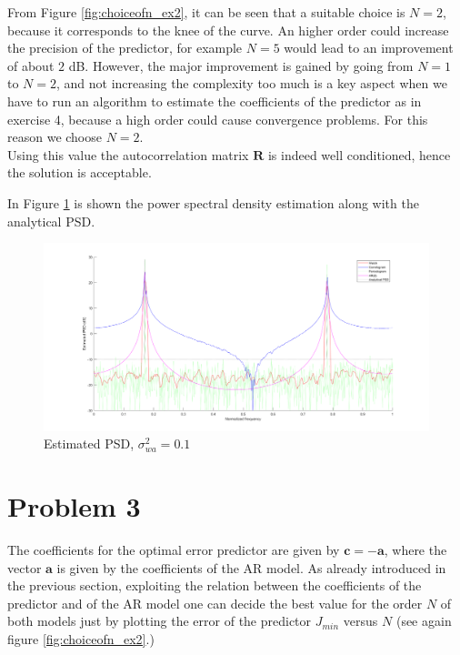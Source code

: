 \documentclass[a4paper, 12pt]{report}
\begin{document}
\begin{itemize}
From Figure \ref{fig:choiceofn_ex2}, it can be seen that a suitable choice is $N=2$, because it corresponds to the knee of the curve. An higher order could increase the precision of the predictor, for example $N=5$ would lead to an improvement of about $2$ dB. However, the major improvement is gained by going from $N=1$ to $N=2$, and not increasing the complexity too much is a key aspect when we have to run an algorithm to estimate the coefficients of the predictor as in exercise 4, because a high order could cause convergence problems. For this reason we choose $N=2$.  \\
Using this value the autocorrelation matrix $\mathbf{R}$ is indeed well conditioned, hence the solution is acceptable.
\end{itemize}

In Figure \ref{fig:estimatedpsd01} is shown the power spectral density estimation along with the analytical PSD.

\begin{figure}[H]
	\centering
	\includegraphics[width=1\textwidth]{estimatedpsd01}
	\caption{Estimated PSD, $\sigma_{wa}^2 = 0.1$}
	\label{fig:estimatedpsd01}
\end{figure}

\section*{Problem 3}
The coefficients for the optimal error predictor are given by $ \mathbf{c} = -\mathbf{a}$, where the vector $\mathbf{a}$ is given by the coefficients of the AR model. As already introduced in the previous section, exploiting the relation between the coefficients of the predictor and of the AR model one can decide the best value for the order $N$ of both models just by plotting the error of the predictor $J_{min}$ versus $N$ (see again figure \ref{fig:choiceofn_ex2}.)
\end{document}
